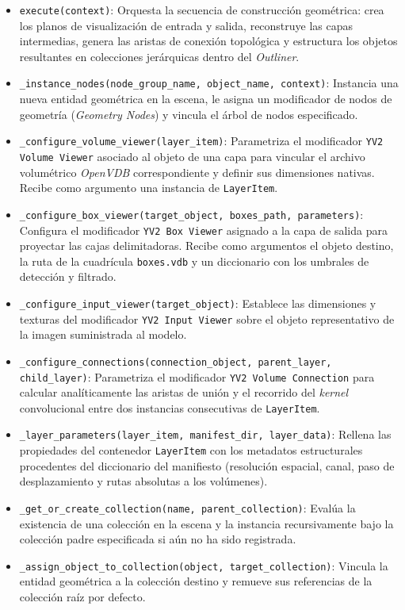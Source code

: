 \begin{itemize}
    \item \texttt{execute(context)}: Orquesta la secuencia de construcción geométrica: crea los planos de visualización de entrada y salida, 
    reconstruye las capas intermedias, genera las aristas de conexión topológica y estructura los objetos resultantes en colecciones jerárquicas 
    dentro del \textit{Outliner}.
    \item \texttt{\_instance\_nodes(node\_group\_name, object\_name, context)}: Instancia una nueva entidad geométrica en la escena, le asigna un 
    modificador de nodos de geometría (\textit{Geometry Nodes}) y vincula el árbol de nodos especificado.
    \item \texttt{\_configure\_volume\_viewer(layer\_item)}: Parametriza el modificador \texttt{YV2 Volume Viewer} asociado al objeto de una capa 
    para vincular el archivo volumétrico \textit{OpenVDB} correspondiente y definir sus dimensiones nativas. Recibe como argumento una instancia 
    de \texttt{LayerItem}.
    \item \texttt{\_configure\_box\_viewer(target\_object, boxes\_path, parameters)}: Configura el modificador \texttt{YV2 Box Viewer} asignado 
    a la capa de salida para proyectar las cajas delimitadoras. Recibe como argumentos el objeto destino, la ruta de la cuadrícula \texttt{boxes.vdb} 
    y un diccionario con los umbrales de detección y filtrado.
    \item \texttt{\_configure\_input\_viewer(target\_object)}: Establece las dimensiones y texturas del modificador \texttt{YV2 Input Viewer} 
    sobre el objeto representativo de la imagen suministrada al modelo.
    \item \texttt{\_configure\_connections(connection\_object, parent\_layer, child\_layer)}: Parametriza el modificador \texttt{YV2 Volume Connection} 
    para calcular analíticamente las aristas de unión y el recorrido del \textit{kernel} convolucional entre dos instancias consecutivas de \texttt{LayerItem}.
    \item \texttt{\_layer\_parameters(layer\_item, manifest\_dir, layer\_data)}: Rellena las propiedades del contenedor \texttt{LayerItem} con los metadatos 
    estructurales procedentes del diccionario del manifiesto (resolución espacial, canal, paso de desplazamiento y rutas absolutas a los volúmenes).
    \item \texttt{\_get\_or\_create\_collection(name, parent\_collection)}: Evalúa la existencia de una colección en la escena y la instancia recursivamente 
    bajo la colección padre especificada si aún no ha sido registrada.
    \item \texttt{\_assign\_object\_to\_collection(object, target\_collection)}: Vincula la entidad geométrica a la colección destino y remueve sus referencias 
    de la colección raíz por defecto.
\end{itemize}

